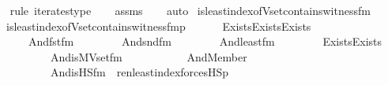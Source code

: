 \begin{isabellebody}
\ \ \isamarkupfalse%
{\isacharparenleft}{\kern0pt}rule\ iterates{\isacharunderscore}{\kern0pt}type{\isacharparenright}{\kern0pt}\isanewline
\ \ \isamarkupfalse%
\ assms\isanewline
\ \ \isamarkupfalse%
\ auto%
\endisatagproof
{\isafoldproof}%
%
\isadelimproof
\isanewline
%
\endisadelimproof
\isanewline
{}\isamarkupfalse%
\ is{\isacharunderscore}{\kern0pt}least{\isacharunderscore}{\kern0pt}index{\isacharunderscore}{\kern0pt}of{\isacharunderscore}{\kern0pt}Vset{\isacharunderscore}{\kern0pt}contains{\isacharunderscore}{\kern0pt}witness{\isacharunderscore}{\kern0pt}fm\ \isanewline
\ \ {\isachardoublequoteopen}is{\isacharunderscore}{\kern0pt}least{\isacharunderscore}{\kern0pt}index{\isacharunderscore}{\kern0pt}of{\isacharunderscore}{\kern0pt}Vset{\isacharunderscore}{\kern0pt}contains{\isacharunderscore}{\kern0pt}witness{\isacharunderscore}{\kern0pt}fm{\isacharparenleft}{\kern0pt}p{\isacharparenright}{\kern0pt}\ {\isasymequiv}\ \isanewline
\ \ \ \ Exists{\isacharparenleft}{\kern0pt}Exists{\isacharparenleft}{\kern0pt}Exists{\isacharparenleft}{\kern0pt}\isanewline
\ \ \ \ \ \ And{\isacharparenleft}{\kern0pt}fst{\isacharunderscore}{\kern0pt}fm{\isacharparenleft}{\kern0pt}{}{\isacharcomma}{\kern0pt}\ {}{\isacharparenright}{\kern0pt}{\isacharcomma}{\kern0pt}\ \isanewline
\ \ \ \ \ \ And{\isacharparenleft}{\kern0pt}snd{\isacharunderscore}{\kern0pt}fm{\isacharparenleft}{\kern0pt}{}{\isacharcomma}{\kern0pt}\ {}{\isacharparenright}{\kern0pt}{\isacharcomma}{\kern0pt}\ \isanewline
\ \ \ \ \ \ And{\isacharparenleft}{\kern0pt}least{\isacharunderscore}{\kern0pt}fm{\isacharparenleft}{\kern0pt}\isanewline
\ \ \ \ \ \ \ \ Exists{\isacharparenleft}{\kern0pt}Exists{\isacharparenleft}{\kern0pt}\isanewline
\ \ \ \ \ \ \ \ \ \ And{\isacharparenleft}{\kern0pt}is{\isacharunderscore}{\kern0pt}MVset{\isacharunderscore}{\kern0pt}fm{\isacharparenleft}{\kern0pt}{}{\isacharcomma}{\kern0pt}\ {}{\isacharparenright}{\kern0pt}{\isacharcomma}{\kern0pt}\isanewline
\ \ \ \ \ \ \ \ \ \ And{\isacharparenleft}{\kern0pt}Member{\isacharparenleft}{\kern0pt}{}{\isacharcomma}{\kern0pt}\ {}{\isacharparenright}{\kern0pt}{\isacharcomma}{\kern0pt}\ \isanewline
\ \ \ \ \ \ \ \ \ \ And{\isacharparenleft}{\kern0pt}is{\isacharunderscore}{\kern0pt}HS{\isacharunderscore}{\kern0pt}fm{\isacharparenleft}{\kern0pt}{}{}{\isacharcomma}{\kern0pt}\ {}{\isacharparenright}{\kern0pt}{\isacharcomma}{\kern0pt}\ ren{\isacharunderscore}{\kern0pt}least{\isacharunderscore}{\kern0pt}index{\isacharparenleft}{\kern0pt}forcesHS{\isacharparenleft}{\kern0pt}p{\isacharparenright}{\kern0pt}{\isacharparenright}{\kern0pt}{\isacharparenright}{\kern0pt}{\isacharparenright}{\kern0pt}{\isacharparenright}{\kern0pt}{\isacharparenright}{\kern0pt}{\isacharparenright}{\kern0pt}{\isacharcomma}{\kern0pt}\ \isanewline

\end{isabellebody}
